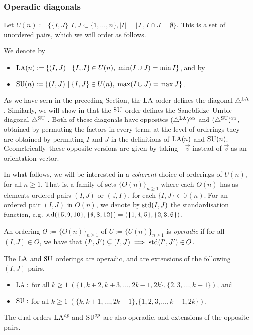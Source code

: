 



\subsubsection{Operadic diagonals}

Let $U(n) := \{ \{I,J\}:I,J \subset \{1,\dots,n\}, |I|= |J|, I\cap J = \emptyset \}$.
This is a set of unordered pairs, which we will order as follows. 

\begin{definition}
We denote by 
\begin{itemize}
    \item $\mathrm{LA}(n):=\{(I,J) \ | \ \{I,J\} \in U(n), \ \min(I\cup J) = \min I\}$, and by 
    \item $\mathrm{SU}(n):=\{(I,J) \ | \ \{I,J\} \in U(n), \ \max(I\cup J) = \max J\}$.
\end{itemize}
\end{definition}

As we have seen in the preceding Section, the $\mathrm{LA}$ order defines the diagonal $\triangle^{\mathrm{LA}}$. 
Similarly, we will show in  that the $\mathrm{SU}$ order defines the Saneblidze--Umble diagonal $\triangle^{\mathrm{SU}}$ \cite{SaneblidzeUmble04}.
Both of these diagonals have opposites $(\triangle^{\mathrm{LA}})^{\mathrm{op}}$ and $(\triangle^{\mathrm{SU}})^{\mathrm{op}}$, obtained by permuting the factors in every term; at the level of orderings they are obtained by permuting $I$ and $J$ in the definitions of $\mathrm{LA}(n)$ and $\mathrm{SU}(n)$. 
Geometrically, these opposite versions are given by taking $-\vec v$ instead of $\vec v$ as an orientation vector. 

In what follows, we will be interested in a \emph{coherent} choice of orderings of $U(n)$, for all $n \geq 1$.
That is, a family of sets $\{O(n)\}_{n\geq 1}$ where each $O(n)$ has as elements ordered pairs $(I,J)$ or $(J,I)$, for each $\{I,J\} \in U(n)$.
For an ordered pair $(I,J)$ in $O(n)$, we denote by $\operatorname{std}(I,J)$ the standardisation function, e.g. $\operatorname{std}(\{5,9,10\},\{6,8,12\}) = (\{1,4,5\},\{2,3,6\})$.

\begin{definition}
An ordering $O:=\{O(n)\}_{n \geq 1}$ of $U:=\{U(n)\}_{n\geq 1}$ is \emph{operadic} if for all $(I,J) \in O$, we have that $(I',J') \subsetneq (I,J) \implies \operatorname{std}(I',J') \in O$. 
\end{definition}

\begin{lemma} \label{lem:operadic-ordering}
The $\mathrm{LA}$ and $\mathrm{SU}$ orderings are operadic, and are extensions of the following $(I,J)$ pairs,
\begin{itemize}
    \item $\mathrm{LA} :$ for all $k\geq 1$  $(\{1,k+2,k+3,\dots,2k-1,2k\}, \{2,3,\dots,k+1\})$, and 
    \item $\mathrm{SU} :$ for all $k\geq 1$  $(\{k,k+1,\dots,2k-1\},\{1,2,3,\dots,k-1,2k\})$. 
\end{itemize}
The dual orders $\mathrm{LA}^{op}$ and $\mathrm{SU}^{op}$ are also operadic, and extensions of the opposite pairs.
\end{lemma}

